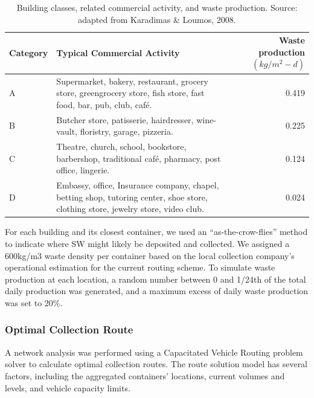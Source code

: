\documentclass[authoryear,preprint,review,11pt,doubleblind]{elsarticle}
\begin{document}
    \begin{table}[h!]
        \centering
        \caption{Building classes, related commercial activity, and waste production. Source: adapted from Karadimas \& Loumos, 2008.}
        \footnotesize
        \label{tab:waste1}
        \begin{tabularx}{\linewidth}{l X r}
            \toprule
            Category&Typical Commercial Activity&\shortstack{Waste production \\
            $(kg/m^2 - d)$}\\
            \midrule
            A& Supermarket, bakery, restaurant, grocery store, greengrocery store, fish store, fast food, bar, pub, club, café.&0.419\\
            B& Butcher store, patisserie, hairdresser, wine-vault, floristry, garage, pizzeria.&0.225\\
            C& Theatre, church, school, bookstore, barbershop, traditional café, pharmacy, post office, lingerie.&0.124\\
            D& Embassy, office, Insurance company, chapel, betting shop, tutoring center, shoe store, clothing store, jewelry store, video club.&0.024\\
            \bottomrule        
        \end{tabularx}
    \end{table}

    For each building and its closest container, we used an “as-the-crow-flies” method to indicate where SW might likely be deposited and collected. We assigned a 600kg/m3 waste density per container based on the local collection company's operational estimation for the current routing scheme. To simulate waste production at each location, a random number between 0 and 1/24th of the total daily production was generated, and a maximum excess of daily waste production was set to 20\%.

    \subsubsection{Optimal Collection Route} \label{subsec:OptimalR}
    A network analysis was performed using a Capacitated Vehicle Routing problem solver \citep{ESRI2023c} to calculate optimal collection routes. The route solution model has several factors, including the aggregated containers’ locations, current volumes and levels, and vehicle capacity limits.

\end{document}
